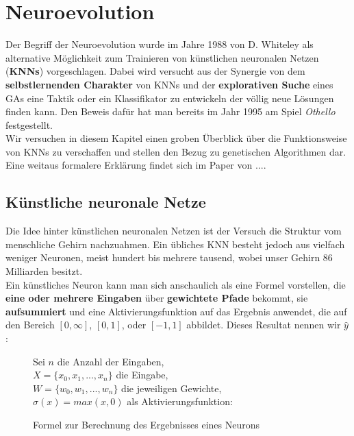     \section{Neuroevolution} \label{neural-evo-definition}
        Der Begriff der Neuroevolution wurde im Jahre 1988 von D. Whiteley \cite{whiteley88} als alternative Möglichkeit zum Trainieren von künstlichen neuronalen Netzen (\textbf{KNNs}) vorgeschlagen. Dabei wird versucht aus der Synergie von dem \textbf{selbstlernenden Charakter} von KNNs und der \textbf{explorativen Suche} eines GAs eine Taktik oder ein Klassifikator zu entwickeln der völlig neue Lösungen finden kann. Den Beweis dafür hat man bereits im Jahr 1995 am Spiel \textit{Othello} festgestellt. \cite{othello95} \\[2mm]
        \noindent
        Wir versuchen in diesem Kapitel einen groben Überblick über die Funktionsweise von KNNs zu verschaffen und stellen den Bezug zu genetischen Algorithmen dar. Eine weitaus formalere Erklärung findet sich im Paper von ....

        \subsection{Künstliche neuronale Netze}

            Die Idee hinter künstlichen neuronalen Netzen ist der Versuch die Struktur vom menschliche Gehirn nachzuahmen. Ein übliches KNN besteht jedoch aus vielfach weniger Neuronen, meist hundert bis mehrere tausend, wobei unser Gehirn 86 Milliarden\cite{brainsize} besitzt.\\
            \noindent
            Ein künstliches Neuron kann man sich anschaulich als eine Formel vorstellen, die \textbf{eine oder mehrere Eingaben} über \textbf{gewichtete Pfade} bekommt, sie \textbf{aufsummiert} und eine Aktivierungsfunktion auf das Ergebnis anwendet, die auf den Bereich $[0,\infty]$, $[0,1]$, oder $[-1,1]$ abbildet. Dieses Resultat nennen wir $\hat{y}$:

            \begin{figure}[H]
                \begin{mdframed}
                    \noindent
                    Sei $n$ die Anzahl der Eingaben,\\
                    \hspace*{4.5mm}    $X = \{x_0,x_1,...,x_n\}$ die Eingabe,\\
                    \hspace*{4.5mm}    $W = \{w_0, w_1,...,w_n\}$ die jeweiligen Gewichte, \\
                    \hspace*{4.5mm}    $\sigma(x) = max(x,0)$ als Aktivierungsfunktion:\\[4mm]
                    \hspace*{50mm} 
                \end{mdframed}
                \caption{\label{neuron-math} Formel zur Berechnung des Ergebnisses eines Neurons}
            \end{figure}

